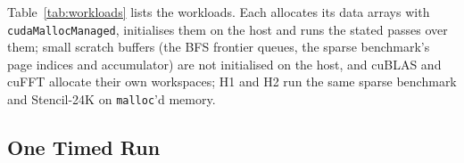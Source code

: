 Table~\ref{tab:workloads} lists the workloads. Each allocates its data
arrays with \texttt{cudaMallocManaged}, initialises them on the host and runs
the stated passes over them; small scratch buffers (the BFS frontier queues, the
sparse benchmark's page indices and accumulator) are not initialised on the
host, and cuBLAS and cuFFT allocate their own workspaces; H1 and H2 run the same sparse benchmark and
Stencil-24K on \texttt{malloc}'d memory.

\begin{table}[t]
\centering
\footnotesize
\caption{Workloads. Footprint: managed memory allocated. Wall t51: median
process wall-clock at the shipped threshold on the RTX~5070~Ti (E7, E8).}
\label{tab:workloads}

\end{table}

\subsection{One Timed Run}
\label{sec:protocol:run}

